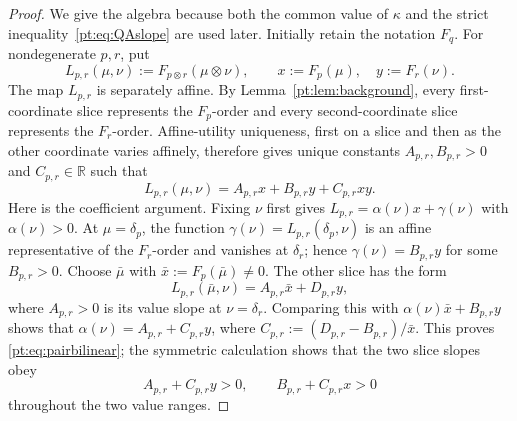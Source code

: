 \begin{proof}
We give the algebra because both the common value of $\kappa$ and the strict
inequality~\eqref{pt:eq:QAslope} are used later.  Initially retain the notation
$F_q$.  For nondegenerate $p,r$, put
\[
 L_{p,r}(\mu,\nu):=F_{p\otimes r}(\mu\otimes\nu),
 \qquad x:=F_p(\mu),\quad y:=F_r(\nu).
\]
The map $L_{p,r}$ is separately affine.  By
Lemma~\ref{pt:lem:background}, every first-coordinate slice represents the
$F_p$-order and every second-coordinate slice represents the $F_r$-order.
Affine-utility uniqueness, first on a slice and then as the other coordinate
varies affinely, therefore gives unique constants
$A_{p,r},B_{p,r}>0$ and $C_{p,r}\in\mathbb R$ such that
\begin{equation}
 L_{p,r}(\mu,\nu)
 =A_{p,r}x+B_{p,r}y+C_{p,r}xy.
\label{pt:eq:pairbilinear}
\end{equation}
Here is the coefficient argument.  Fixing $\nu$ first gives
$L_{p,r}=\alpha(\nu)x+\gamma(\nu)$ with $\alpha(\nu)>0$.  At
$\mu=\delta_p$, the function
$\gamma(\nu)=L_{p,r}(\delta_p,\nu)$ is an affine representative of the
$F_r$-order and vanishes at $\delta_r$; hence
$\gamma(\nu)=B_{p,r}y$ for some $B_{p,r}>0$.  Choose
$\bar\mu$ with $\bar x:=F_p(\bar\mu)\ne0$.  The other slice has the form
\[
 L_{p,r}(\bar\mu,\nu)=A_{p,r}\bar x+D_{p,r}y,
\]
where $A_{p,r}>0$ is its value slope at $\nu=\delta_r$.  Comparing this with
$\alpha(\nu)\bar x+B_{p,r}y$ shows that
$\alpha(\nu)=A_{p,r}+C_{p,r}y$, where
$C_{p,r}:=(D_{p,r}-B_{p,r})/\bar x$.  This proves
\eqref{pt:eq:pairbilinear}; the symmetric calculation shows that the two
slice slopes obey
\begin{equation}
 A_{p,r}+C_{p,r}y>0,
 \qquad B_{p,r}+C_{p,r}x>0
\label{pt:eq:pair-slopes}
\end{equation}
throughout the two value ranges.


\end{proof}
